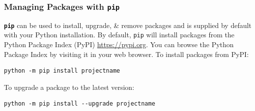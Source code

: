 \documentclass[a4paper,11pt]{article}
\begin{document}
\subsubsection{Managing Packages with \texttt{pip}}
\textbf{\texttt{pip}} can be used to install, upgrade, \& remove packages and is supplied by default with
your Python installation.
By default, \texttt{pip} will install packages from the Python Package Index (PyPI) \url{https://pypi.org}.
You can browse the Python Package Index by visiting it in your web browser.
To install packages from PyPI:
\begin{verbatim}
python -m pip install projectname
\end{verbatim}

To upgrade a package to the latest version:
\begin{verbatim}
python -m pip install --upgrade projectname
\end{verbatim}
\end{document}
